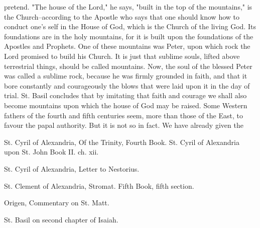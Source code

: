pretend. "The house of the Lord," he says, "built in the top of the mountains," is the Church--according to the Apostle who says that one should know how to conduct one’s self in the House of God, which is the Church of the living God. Its foundations are in the holy mountains, for it is built upon the foundations of the Apostles and Prophets. One of these mountains was Peter, upon which rock the Lord promised to build his Church. It is just that sublime souls, lifted above terrestrial things, should be called mountains. Now, the soul of the blessed Peter was called a sublime rock, because he was firmly grounded in faith, and that it bore constantly and courageously the blows that were laid upon it in the day of trial. St. Basil concludes that by imitating that faith and courage we shall also become mountains upon which the house of God may be raised. Some Western fathers of the fourth and fifth centuries seem, more than those of the East, to favour the papal authority. But it is not so in fact. We have already given the

St. Cyril of Alexandria, Of the Trinity, Fourth Book. St. Cyril of Alexandria upon St. John Book II. ch. xii.

St. Cyril of Alexandria, Letter to Nestorius.

St. Clement of Alexandria, Stromat. Fifth Book, fifth section.

Origen, Commentary on St. Matt.

St. Basil on second chapter of Isaiah.

